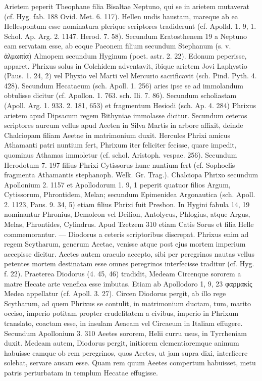 \documentclass[a4paper, 11pt, oneside, polutonikogreek, german]{article}
\begin{document}
Arietem peperit Theophane filia Bisaltae Neptuno, qui se in arietem mutaverat (cf. Hyg. fab. 188 Ovid. Met. 6. 117). Hellen undis haustam, mareque ab ea Hellespontum esse nominatura plerique scriptores tradiderunt (cf. Apolld. 1. 9, 1. Schol. Ap. Arg. 2. 1147. Herod. 7. 58). Secundum Eratosthenem 19 a Neptuno eam servatam esse, ab eoque Paeonem filium secundum Stephanum (s. v. ἀλμωπία) Almopem secundum Hyginum (poet. astr. 2. 22). Edonum peperisse, apparet. Phrixus solus in Colchidem adventavit, ibique arietem Jovi Laphystio (Paus. 1. 24, 2) vel Phyxio vel Marti vel Mercurio sacrificavit (sch. Pind. Pyth. 4. 428). Secundum Hecataeum (sch. Apoll. 1. 256) aries ipse se ad immolandum obtulisse dicitur (cf. Apollon. 1. 763. sch. Ili. 7. 86). Secundum scholiastam (Apoll. Arg. 1. 933. 2. 181, 653) et fragmentum Hesiodi (sch. Ap. 4. 284) Phrixus arietem apud Dipsacum regem Bithyniae immolasse dicitur. Secundum ceteros scriptores aureum vellus apud Aeeten in Silva Martis in arbore affixit, deinde Chalciopam filiam Aeetae in matrimonium duxit. Hercules Phrixi amicus Athamanti patri nuntium fert, Phrixum iter feliciter fecisse, quare impedit, quominus Athamas immoletur (cf. schol. Aristoph. vespae. 256). Secundum Herodotum 7. 197 filius Phrixi Cytissorus hunc nuntium fert (cf. Sophoclis fragmenta Athamantis stephanoph. Welk. Gr. Trag.). Chalciopa Phrixo secundum Apollonium 2. 1157 et Apollodorum 1. 9, 1 peperit quatuor filios Argum, Cytissorum, Phrontidem, Melan; secundum Epimenidea Argonautica (sch. Apoll. 2. 1123, Paus. 9. 34, 5) etiam filius Phrixi fuit Presbon. In Hygini fabula 14, 19 nominantur Phronius, Demoleon vel Deilion, Antolycus, Phlogius, atque Argus, Melas, Phrontides, Cylindrus. Apud Tzetzem 310 etiam Catis Sorus et filia Helle commemorantur. --- Diodorus a ceteris scriptoribus discrepat. Phrixus enim ad regem Scytharum, generum Aeetae, venisse atque post ejus mortem imperium accepisse dicitur. Aeetes autem oraculo accepto, sibi per peregrinos nautas vellus petentes mortem destinatam esse omnes peregrinos interfecisse traditur (cf. Hyg. f. 22). Praeterea Diodorus (4. 45, 46) tradidit, Medeam Circenque sororem a matre Hecate arte venefica esse imbutas. Etiam ab Apollodoro 1, 9, 23 φαρμακίς Medea appellatur (cf. Apoll. 3. 27). Circen Diodorus pergit, ab illo rege Scytharum, ad quem Phrixus se contulit, in matrimonium ductam, tum, marito occiso, imperio potitam propter crudelitatem a civibus, imperio in Phrixum translato, coactam esse, in insulam Aeaeam vel Circaeum in Italiam effugere. Secundum Apollonium 3. 310 Aeetes sororem, Helii curru usus, in Tyrrheniam duxit. Medeam autem, Diodorus pergit, initiorem clementioremque animum habuisse eamque ob rem peregrinos, quos Aeetes, ut jam supra dixi, interficere solebat, servare ausam esse. Quam rem quum Aeetes compertum habuisset, metu patris perturbatam in templum Hecatae effugisse.
\end{document}
